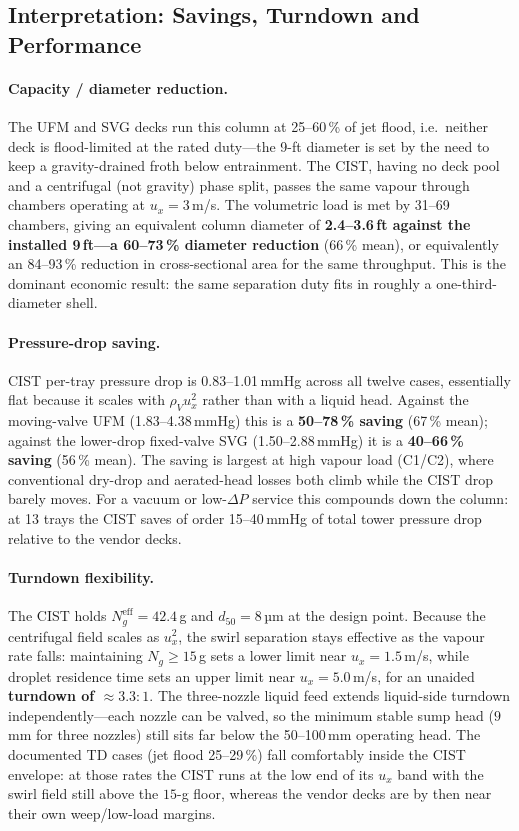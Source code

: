 \documentclass[11pt,letterpaper]{article}
\newcommand{\rhoV}{\rho_V}
\newcommand{\ux}{u_{x}}
\begin{document}
\subsection{Interpretation: Savings, Turndown and Performance}

\paragraph{Capacity / diameter reduction.}  The UFM and SVG decks run
this column at 25--60\,\% of jet flood, i.e.\ neither deck is
flood-limited at the rated duty---the 9-ft diameter is set by the need
to keep a gravity-drained froth below entrainment.  The CIST, having no
deck pool and a centrifugal (not gravity) phase split, passes the same
vapour through chambers operating at $\ux = 3$\,m/s.  The volumetric
load is met by 31--69 chambers, giving an equivalent column diameter of
\textbf{2.4--3.6\,ft against the installed 9\,ft---a 60--73\,\%
diameter reduction} (66\,\% mean), or equivalently an 84--93\,\%
reduction in cross-sectional area for the same throughput.  This is the
dominant economic result: the same separation duty fits in roughly a
one-third-diameter shell.

\paragraph{Pressure-drop saving.}  CIST per-tray pressure drop is
0.83--1.01\,mmHg across all twelve cases, essentially flat because it
scales with $\rhoV\ux^2$ rather than with a liquid head.  Against the
moving-valve UFM (1.83--4.38\,mmHg) this is a \textbf{50--78\,\% saving}
(67\,\% mean); against the lower-drop fixed-valve SVG
(1.50--2.88\,mmHg) it is a \textbf{40--66\,\% saving} (56\,\% mean).
The saving is largest at high vapour load (C1/C2), where conventional
dry-drop and aerated-head losses both climb while the CIST drop barely
moves.  For a vacuum or low-$\Delta P$ service this compounds down the
column: at 13 trays the CIST saves of order 15--40\,mmHg of total tower
pressure drop relative to the vendor decks.

\paragraph{Turndown flexibility.}  The CIST holds $N_g^{\mathrm{eff}}
= 42.4$\,g and $d_{50} = 8$\,µm at the design point.  Because the
centrifugal field scales as $\ux^2$, the swirl separation stays
effective as the vapour rate falls: maintaining $N_g \ge 15$\,g sets a
lower limit near $\ux = 1.5$\,m/s, while droplet residence time sets an
upper limit near $\ux = 5.0$\,m/s, for an unaided \textbf{turndown of
$\approx 3.3{:}1$}.  The three-nozzle liquid feed extends liquid-side
turndown independently---each nozzle can be valved, so the minimum
stable sump head ($9$\,mm for three nozzles) still sits far below the
50--100\,mm operating head.  The documented TD cases (jet flood
25--29\,\%) fall comfortably inside the CIST envelope: at those rates
the CIST runs at the low end of its $\ux$ band with the swirl field
still above the $15$-g floor, whereas the vendor decks are by then near
their own weep/low-load margins.
\end{document}
